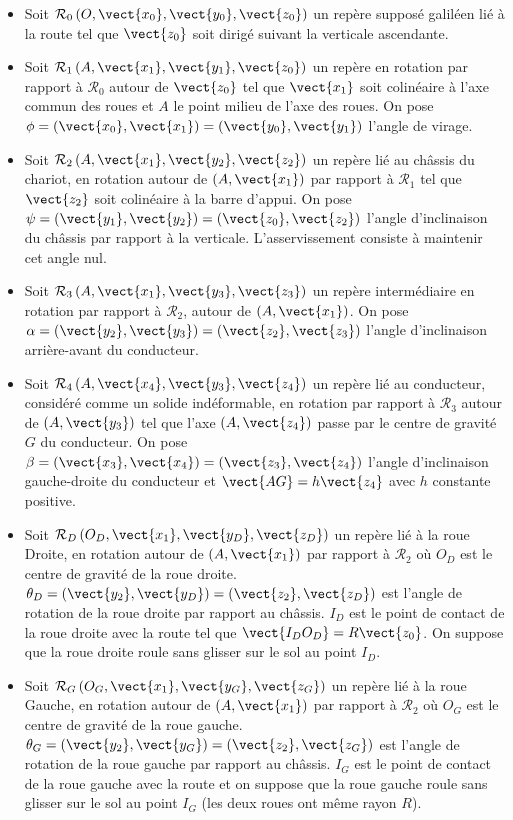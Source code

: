 \begin{itemize}
\item Soit $\mathcal{R}_0\left(O,\vect{x_0},\vect{y_0},\vect{z_0} \right)$  un repère supposé galiléen lié à la route tel que $\vect{z_0}$ soit dirigé suivant la verticale ascendante.
\item Soit $\mathcal{R}_1\left(A,\vect{x_1},\vect{y_1},\vect{z_0} \right)$ un repère en rotation par rapport à $\mathcal{R}_0$  autour de $\vect{z_0}$  tel que $\vect{x_1}$ soit colinéaire à l’axe commun des roues et $A$ le point milieu de l’axe des roues. On pose $\phi=\left(\vect{x_0},\vect{x_1}\right)=\left(\vect{y_0},\vect{y_1}\right)$  l’angle de virage.
\item Soit $\mathcal{R}_2\left(A,\vect{x_1},\vect{y_2},\vect{z_2} \right)$ un repère lié au châssis du chariot, en rotation autour de $\left(A,\vect{x_1}\right)$ par rapport à  $\mathcal{R}_1$  tel que $\vect{z_2}$  soit colinéaire à la barre d’appui. On pose  $\psi=\left(\vect{y_1},\vect{y_2}\right)=\left(\vect{z_0},\vect{z_2}\right)$  l’angle d’inclinaison du châssis par rapport à la verticale. L’asservissement consiste à maintenir cet angle nul.
\item Soit $\mathcal{R}_3\left(A,\vect{x_1},\vect{y_3},\vect{z_3} \right)$ un repère intermédiaire en rotation par rapport à $\mathcal{R}_2$, autour de  $\left(A,\vect{x_1}\right)$. On pose $\alpha=\left(\vect{y_2},\vect{y_3}\right)=\left(\vect{z_2},\vect{z_3}\right)$ l’angle d’inclinaison arrière-avant du conducteur.
\item Soit $\mathcal{R}_4\left(A,\vect{x_4},\vect{y_3},\vect{z_4} \right)$ un repère lié au conducteur, considéré comme un solide indéformable, en rotation par rapport à $\mathcal{R}_3$ autour de $\left(A,\vect{y_3}\right)$ tel que l’axe $\left(A,\vect{z_4}\right)$ passe par le centre de gravité $G$ du conducteur. On pose $\beta=\left(\vect{x_3},\vect{x_4}\right)=\left(\vect{z_3},\vect{z_4}\right)$ l’angle d’inclinaison gauche-droite du conducteur et $\vect{AG}=h\vect{z_4}$ avec $h$ constante positive.
\item Soit $\mathcal{R}_D\left(O_D,\vect{x_1},\vect{y_D},\vect{z_D} \right)$ un repère lié à la roue Droite, en rotation autour de $\left(A,\vect{x_1}\right)$  par rapport à $\mathcal{R}_2$ où $O_D$ est le centre de gravité de la roue droite.  
$\theta_D=\left(\vect{y_2},\vect{y_D}\right)=\left(\vect{z_2},\vect{z_D}\right)$ est l’angle de rotation de la roue droite par rapport au châssis. $I_D$ est le point de contact de la roue droite avec la route tel que  $\vect{I_D O_D}=R\vect{z_0}$. On suppose que la roue droite roule sans glisser sur le sol au point  $I_D$.
\item Soit $\mathcal{R}_G\left(O_G,\vect{x_1},\vect{y_G},\vect{z_G} \right)$ un repère lié à la roue Gauche, en rotation autour de $\left(A,\vect{x_1}\right)$  par rapport à $\mathcal{R}_2$ où $O_G$ est le centre de gravité de la roue gauche.  
$\theta_G=\left(\vect{y_2},\vect{y_G}\right)=\left(\vect{z_2},\vect{z_G}\right)$ est l’angle de rotation de la roue gauche par rapport au châssis. $I_G$ est le point de contact de la roue gauche avec la route et on suppose que la roue gauche roule sans glisser sur le sol au point $I_G$ (les deux roues ont même rayon $R$).
\end{itemize}

